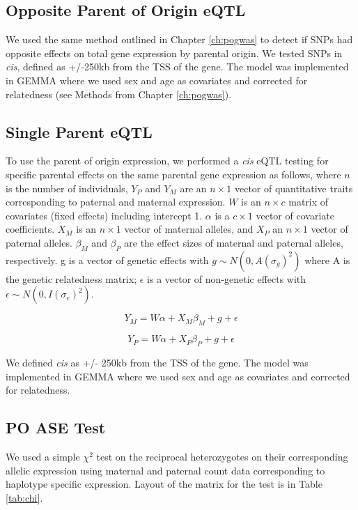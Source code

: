\subsection{Opposite Parent of Origin eQTL}\label{Opposite Parent of Origin eQTL}
We used the same method outlined in Chapter \ref{ch:pogwas} to detect if SNPs had opposite effects on total gene expression by parental origin. We tested SNPs in \emph{cis}, defined as +/-250kb from the TSS of the gene. The model was implemented in GEMMA\cite{Zhou2012} where we used sex and age as covariates and corrected for relatedness (see Methods from Chapter  \ref{ch:pogwas}).

\subsection{Single Parent eQTL}\label{Single Parent eQTL}
To use the parent of origin expression, we performed a \emph{cis} eQTL testing for specific parental effects on the same parental gene expression as follows, where  $n$ is the number of individuals, $Y_{P}$ and $Y_{M}$ are an $n \times 1$ vector of quantitative traits corresponding to paternal and maternal expression. $W$ is an $n \times c$ matrix of covariates (fixed effects) including intercept 1. $\alpha$ is a $c \times 1$ vector of covariate coefficients. $X_M$  is an $n \times 1$ vector of maternal alleles, and $X_P$ an $n \times 1$ vector of paternal alleles. $\beta_M$ and $\beta_P$ are the effect sizes of maternal and paternal alleles, respectively. g is a vector of genetic effects with $g \sim N(0, A(\sigma_g)^2 )$ where A is the genetic relatedness matrix; $\epsilon$ is a vector of non-genetic effects with $\epsilon \sim N(0,I(\sigma_e)^2)$.

\begin{equation}
Y _{M}=W\alpha + X_{M}\beta_{M}+g+\epsilon
\end{equation}

\begin{equation}
Y _{P}=W\alpha + X_{P}\beta_{P}+g+\epsilon
\end{equation}

We defined \emph{cis} as +/- 250kb from the TSS of the gene. The model was implemented in GEMMA\cite{Zhou2012} where we used sex and age as covariates and corrected for relatedness.

\subsection{PO ASE Test}\label{PO ASE Test}
We used a simple $\chi^2$ test on the reciprocal heterozygotes on their corresponding allelic expression using maternal and paternal count data corresponding to haplotype specific expression. Layout of the matrix for the test is in Table \ref{tab:chi}.

